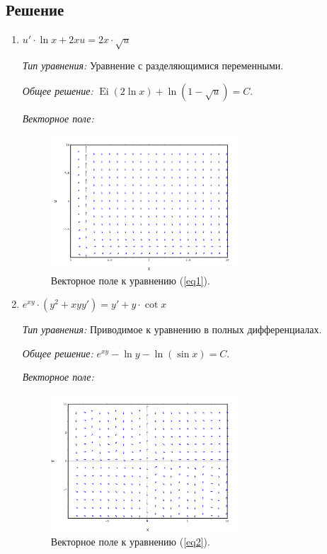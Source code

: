 \documentclass[14pt, a4paper, titlepage, fleqn]{extarticle}
\DeclareMathOperator{\Ei}{Ei}
\begin{document}
        \subsection{Решение}
            \begin{enumerate}
                \item \( u' \cdot \ln{x} + 2xu = 2x \cdot \sqrt{u} \)
                    \label{eq1}

                    \textit{Тип уравнения:}
                        Уравнение с разделяющимися переменными.

                    \textit{Общее решение:}
                        \( \Ei(2 \ln{x}) + \ln(1 - \sqrt{u}) = C. \)

                    \textit{Векторное поле:}

                        \begin{figure}[H]
                            \centering
                            \includegraphics[width=7cm]{pictures/vector_field_1.pdf}
                            \caption{Векторное поле к уравнению (\ref{eq1}).}
                        \end{figure}
                
                \item \( e^{xy} \cdot \left( y^2 + xyy' \right) = y' + y \cdot \cot{x} \)
                    \label{eq2}

                    \textit{Тип уравнения:}
                        Приводимое к уравнению в полных дифференциалах. %

                    \textit{Общее решение:}
                        \( e^{xy} - \ln{y} - \ln(\sin{x}) = C. \)

                    \textit{Векторное поле:}

                        \begin{figure}[H]
                            \centering
                            \includegraphics[width=7cm]{pictures/vector_field_2.pdf}
                            \caption{Векторное поле к уравнению (\ref{eq2}).}
                        \end{figure}
                

\end{enumerate}
\end{document}
